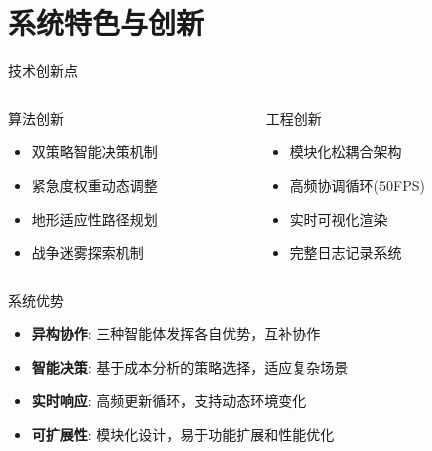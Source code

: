 \documentclass[
10pt,
aspectratio=169,
]{beamer}
\begin{document}

\section{系统特色与创新}

\begin{frame}{技术创新点}
    \begin{columns}
        \begin{column}{0.5\textwidth}
            \begin{block}{算法创新}
                \begin{itemize}
                    \item 双策略智能决策机制
                    \item 紧急度权重动态调整
                    \item 地形适应性路径规划
                    \item 战争迷雾探索机制
                \end{itemize}
            \end{block}
        \end{column}
        \begin{column}{0.5\textwidth}
            \begin{block}{工程创新}
                \begin{itemize}
                    \item 模块化松耦合架构
                    \item 高频协调循环(50FPS)
                    \item 实时可视化渲染
                    \item 完整日志记录系统
                \end{itemize}
            \end{block}
        \end{column}
    \end{columns}
    
    \begin{alertblock}{系统优势}
        \begin{itemize}
            \item \textbf{异构协作}: 三种智能体发挥各自优势，互补协作
            \item \textbf{智能决策}: 基于成本分析的策略选择，适应复杂场景
            \item \textbf{实时响应}: 高频更新循环，支持动态环境变化
            \item \textbf{可扩展性}: 模块化设计，易于功能扩展和性能优化
        \end{itemize}
    \end{alertblock}
\end{frame}
\end{document}
